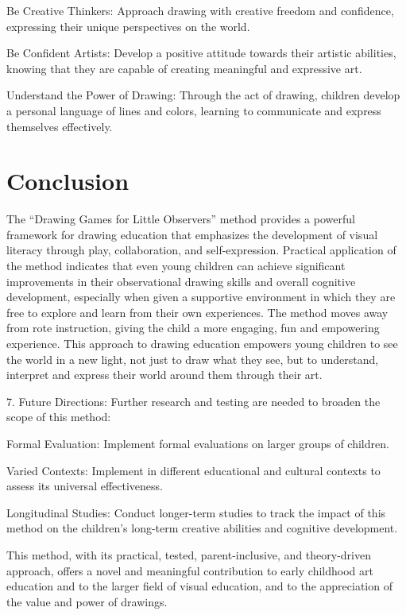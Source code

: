 \documentclass{article}
\begin{document}
Be Creative Thinkers: Approach drawing with creative freedom and confidence, expressing their unique perspectives on the world.

Be Confident Artists: Develop a positive attitude towards their artistic abilities, knowing that they are capable of creating meaningful and expressive art.

Understand the Power of Drawing: Through the act of drawing, children develop a personal language of lines and colors, learning to communicate and express themselves effectively.

\section{Conclusion}

The “Drawing Games for Little Observers” method provides a powerful framework for drawing education that emphasizes the development of visual literacy through play, collaboration, and self-expression. Practical application of the method indicates that even young children can achieve significant improvements in their observational drawing skills and overall cognitive development, especially when given a supportive environment in which they are free to explore and learn from their own experiences. The method moves away from rote instruction, giving the child a more engaging, fun and empowering experience.
This approach to drawing education empowers young children to see the world in a new light, not just to draw what they see, but to understand, interpret and express their world around them through their art.

7. Future Directions:
Further research and testing are needed to broaden the scope of this method:

Formal Evaluation: Implement formal evaluations on larger groups of children.

Varied Contexts: Implement in different educational and cultural contexts to assess its universal effectiveness.

Longitudinal Studies: Conduct longer-term studies to track the impact of this method on the children’s long-term creative abilities and cognitive development.

This method, with its practical, tested, parent-inclusive, and theory-driven approach, offers a novel and meaningful contribution to early childhood art education and to the larger field of visual education, and to the appreciation of the value and power of drawings.


\end{document}
